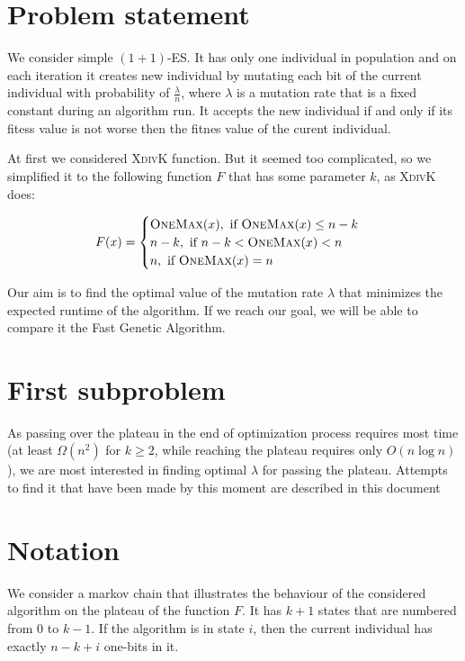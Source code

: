 \documentclass{article}
\newcommand{\OM}{\textsc{OneMax}\xspace}
\newcommand{\XdK}{\textsc{XdivK}\xspace}
\begin{document}
\section{Problem statement}

We consider simple $(1 + 1)$-ES. It has only one individual in population and on each iteration it creates new individual by mutating each bit of the current individual with probability of $\frac{\lambda}{n}$, where $\lambda$ is a mutation rate that is a fixed constant during an algorithm run. It accepts the new individual if and only if its fitess value is not worse then the fitnes value of the curent individual.

At first we considered \XdK function. But it seemed too complicated, so we simplified it to the following function $F$ that has some parameter $k$, as \XdK does:

\begin{align*}
  F(x) =
  \begin{cases}
    \OM(x), \text{ if } \OM(x) \le n - k \\
    n - k, \text{ if } n - k < \OM(x) < n \\
    n, \text{ if } \OM(x) = n \\
  \end{cases}
\end{align*}

Our aim is to find the optimal value of the mutation rate $\lambda$ that minimizes the expected runtime of the algorithm. If we reach our goal, we will be able to compare it the Fast Genetic Algorithm.

\section{First subproblem}
As passing over the plateau in the end of optimization process requires most time (at least $\Omega(n^2)$ for $k \ge 2$, while reaching the plateau requires only $O(n \log n)$), we are most interested in finding optimal $\lambda$ for passing the plateau. Attempts to find it that have been made by this moment are described in this document

\section{Notation}

We consider a markov chain that illustrates the behaviour of the considered algorithm on the plateau of the function $F$. It has $k + 1$ states that are numbered from $0$ to $k - 1$. If the algorithm is in state $i$, then the current individual has exactly $n - k + i$ one-bits in it.
\end{document}
